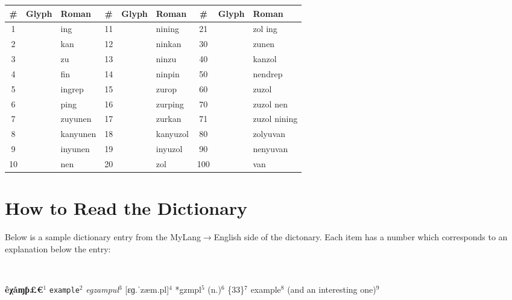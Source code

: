 \documentclass[oneside]{book}
\begin{document}
\begin{center}
\begin{tabular}{|c|c|l|c|c|l|c|c|l|}\hline
\textbf{\#}&\textbf{Glyph}&\textbf{Roman}&\textbf{\#}&\textbf{Glyph}&\textbf{Roman}&\textbf{\#}&\textbf{Glyph}&\textbf{Roman}\\\hline
1&&ing&11&&nining&21&&zol ing\\\hline
2&&kan&12&&ninkan&30&&zunen\\\hline
3&&zu&13&&ninzu&40&&kanzol\\\hline
4&&fin&14&&ninpin&50&&nendrep\\\hline
5&&ingrep&15&&zurop&60&&zuzol\\\hline
6&&ping&16&&zurping&70&&zuzol nen\\\hline
7&&zuyunen&17&&zurkan&71&&zuzol nining\\\hline
8&&kanyunen&18&&kanyuzol&80&&zolyuvan\\\hline
9&&inyunen&19&&inyuzol&90&&nenyuvan\\\hline
10&&nen&20&&zol&100&&van\\\hline
\end{tabular}
\end{center}

\chapter{How to Read the Dictionary}

Below is a sample dictionary entry from the MyLang$\rightarrow$English side of the dictonary.
Each item has a number which corresponds to an explanation below the entry:

{\ }

\noindent
\textbf{êχåɱƥ£€}$^1$ \texttt{example}$^2$ \textsl{egzampul}$^3$ [ɛɡ.ˈzæm.pl]$^4$ *gzmpl$^5$ (n.)$^6$ \{33\}$^7$ example$^8$ (and an interesting one)$^9$
\end{document}
